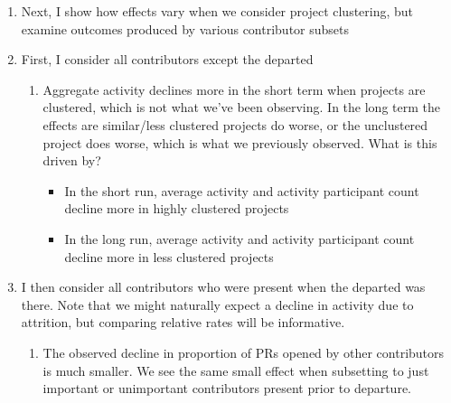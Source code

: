 \begin{enumerate}
    \item Next, I show how effects vary when we consider project clustering, but examine outcomes produced by various contributor subsets
    \item First, I consider all contributors except the departed
    \begin{enumerate}
        \item Aggregate activity declines more in the short term when projects are clustered, which is not what we've been observing. In the long term the effects are similar/less clustered projects do worse, or the unclustered project does worse, which is what we previously observed.  What is this driven by?
        \begin{itemize}
            \item In the short run, average activity and activity participant count decline more in highly clustered projects
            \item In the long run, average activity and activity participant count decline more in less clustered projects
        \end{itemize}
    \end{enumerate}
    \item I then consider all contributors who were present when the departed was there. Note that we might naturally expect a decline in activity due to attrition, but comparing relative rates will be informative. 
    \begin{enumerate}
        \item The observed decline in proportion of PRs opened by other contributors is much smaller. We see the same small effect when subsetting to just important or unimportant contributors present prior to departure. 

\end{enumerate}
\end{enumerate}
